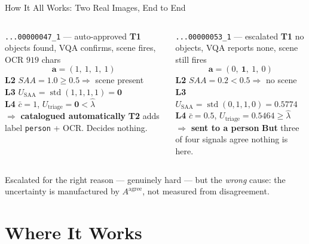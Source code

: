 \documentclass[aspectratio=169,11pt]{beamer}
\begin{document}
\begin{frame}{How It All Works: Two Real Images, End to End}
\scriptsize
\begin{columns}[T]
\begin{exampleblock}{\scriptsize \texttt{...00000047\_1} --- auto-approved}
\scriptsize
\textbf{T1} objects found, VQA confirms, scene fires, OCR $919$ chars
\[ \mathbf{a} = (1,\ 1,\ 1,\ 1) \]
\textbf{L2} $SAA = \mathbf{1.0} \ge 0.5 \Rightarrow$ scene present \\
\textbf{L3} $U_{\text{SAA}} = \operatorname{std}(1,1,1,1) = \mathbf{0}$ \\
\textbf{L4} $\bar c = 1$, $U_{\text{triage}} = \mathbf{0} < \hat\lambda$ \\
$\Rightarrow$ \textbf{catalogued automatically}
\vskip 2pt
\textbf{T2} adds label \texttt{person} + OCR. Decides nothing.
\end{exampleblock}

\begin{alertblock}{\scriptsize \texttt{...00000053\_1} --- escalated}
\scriptsize
\textbf{T1} no objects, VQA reports none, scene still fires
\[ \mathbf{a} = (0,\ \mathbf{1},\ 1,\ 0) \]
\textbf{L2} $SAA = \mathbf{0.2} < 0.5 \Rightarrow$ no scene \\
\textbf{L3} $U_{\text{SAA}} = \operatorname{std}(0,1,1,0) = \mathbf{0.5774}$ \\
\textbf{L4} $\bar c = 0.5$, $U_{\text{triage}} = \mathbf{0.5464} \ge \hat\lambda$ \\
$\Rightarrow$ \textbf{sent to a person}
\vskip 2pt
\textbf{But} three of four signals agree nothing is here.
\end{alertblock}
\end{columns}
\vspace{-0.5mm}
\footnotesize Escalated for the right reason --- genuinely hard --- but the \emph{wrong} cause: the uncertainty is manufactured by $A^{\text{agree}}$, not measured from disagreement.
\end{frame}

\section{Where It Works}
\end{document}
